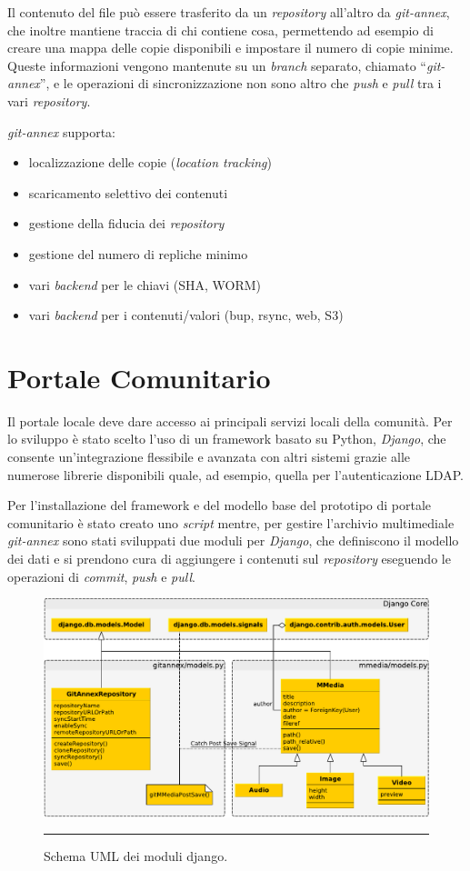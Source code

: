 Il contenuto del file può essere trasferito da un \emph{repository}
all'altro da \emph{git-annex}, che inoltre mantiene traccia di chi
contiene cosa, permettendo ad esempio di creare una mappa delle copie
disponibili e impostare il numero di copie minime. Queste informazioni
vengono mantenute su un \emph{branch} separato, chiamato
``\emph{git-annex}'', e le operazioni di sincronizzazione non sono
altro che \emph{push} e \emph{pull} tra i vari \emph{repository}.

\emph{git-annex} supporta:
\begin{itemize}
\item localizzazione delle copie (\emph{location tracking})
\item scaricamento selettivo dei contenuti
\item gestione della fiducia dei \emph{repository}
\item gestione del numero di repliche minimo 
\item vari \emph{backend} per le chiavi (SHA, WORM)
\item vari \emph{backend} per i contenuti/valori (bup, rsync, web, S3)
\end{itemize}

\section{Portale Comunitario}
Il portale locale deve dare accesso ai principali servizi locali della
comunità. Per lo sviluppo è stato scelto l'uso di un framework basato
su Python, \emph{Django}, che consente un'integrazione flessibile e
avanzata con altri sistemi grazie alle numerose librerie disponibili
quale, ad esempio, quella per l'autenticazione LDAP.

Per l'installazione del framework e del modello base del prototipo di
portale comunitario è stato creato uno \emph{script} mentre, per
gestire l'archivio multimediale \emph{git-annex} sono stati sviluppati
due moduli per \emph{Django}, che definiscono il modello dei dati e si
prendono cura di aggiungere i contenuti sul \emph{repository}
eseguendo le operazioni di \emph{commit}, \emph{push} e \emph{pull}.

\begin{figure}[htbp]
  \centering
  \includegraphics[width=\textwidth]{./Figure/UML_Schema_Django-crop.pdf}
  \rule{35em}{0.5pt}
  \caption[Schema UML dei moduli django]{Schema UML dei moduli django.}
  \label{fig:SchemaUMLDjango}
\end{figure}

